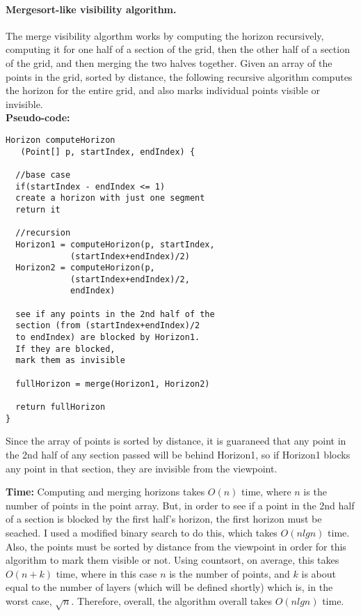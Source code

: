 \documentclass[11pt,twocolumn]{article}
\begin{document}
\paragraph{Mergesort-like visibility algorithm. }
The merge visibility algorthm works by computing the horizon recursively, computing it for one half of a section of the grid, then the other half of a section of the grid, and then merging the two halves together.  Given an array of the points in the grid, sorted by distance, the following recursive algorithm computes the horizon for the entire grid, and also marks individual points visible or invisible.\\
{\bf Pseudo-code:}
\begin{verbatim}
Horizon computeHorizon
   (Point[] p, startIndex, endIndex) {

  //base case
  if(startIndex - endIndex <= 1)
  create a horizon with just one segment
  return it

  //recursion
  Horizon1 = computeHorizon(p, startIndex, 
             (startIndex+endIndex)/2)
  Horizon2 = computeHorizon(p, 
             (startIndex+endIndex)/2, 
             endIndex)

  see if any points in the 2nd half of the 
  section (from (startIndex+endIndex)/2
  to endIndex) are blocked by Horizon1.  
  If they are blocked, 
  mark them as invisible

  fullHorizon = merge(Horizon1, Horizon2)

  return fullHorizon
}
\end{verbatim}

Since the array of points is sorted by distance, it is guaraneed that any point in the 2nd half of any section passed will be behind Horizon1, so if Horizon1 blocks any point in that section, they are invisible from the viewpoint.

{\bf Time:}  Computing and merging horizons takes $O(n)$ time, where $n$ is the number of points in the point array.  But, in order to see if a point in the 2nd half of a section is blocked by the first half's horizon, the first horizon must be seached.  I used a modified binary search to do this, which takes $O(nlgn)$ time.  Also, the points must be sorted by distance from the viewpoint in order for this algorithm to mark them visible or not.  Using countsort, on average, this takes $O(n+k)$ time, where in this case $n$ is the number of points, and $k$ is about equal to the number of layers (which will be defined shortly) which is, in the worst case, $\sqrt{n}$.  Therefore, overall, the algorithm overall takes $O(nlgn)$ time.
\end{document}
